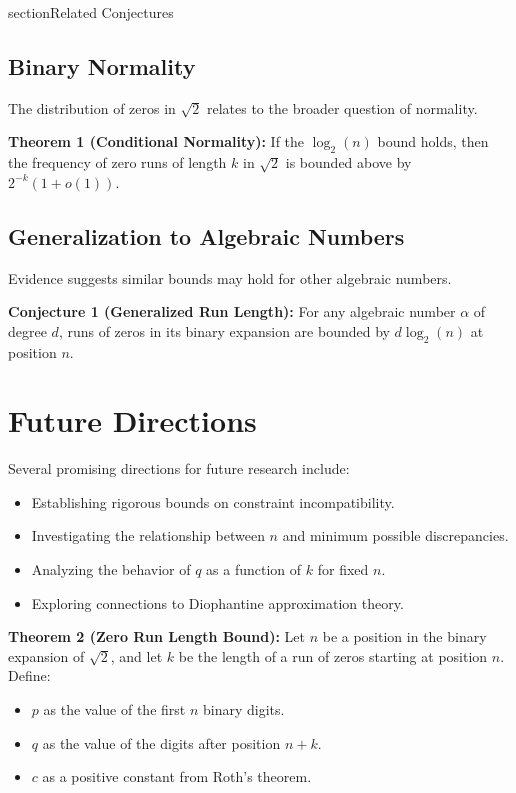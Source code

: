 section{Related Conjectures}

\subsection{Binary Normality}
The distribution of zeros in $\sqrt{2}$ relates to the broader question of normality.

\textbf{Theorem 1 (Conditional Normality):} If the $\log_2(n)$ bound holds, then the frequency of zero
runs of length $k$ in $\sqrt{2}$ is bounded above by $2^{-k}(1 + o(1))$.

\subsection{Generalization to Algebraic Numbers}
Evidence suggests similar bounds may hold for other algebraic numbers.

\textbf{Conjecture 1 (Generalized Run Length):} For any algebraic number $\alpha$ of degree $d$, runs of
zeros in its binary expansion are bounded by $d \log_2(n)$ at position $n$.

\section{Future Directions}
Several promising directions for future research include:
\begin{itemize}
    \item Establishing rigorous bounds on constraint incompatibility.
    \item Investigating the relationship between $n$ and minimum possible discrepancies.
    \item Analyzing the behavior of $q$ as a function of $k$ for fixed $n$.
    \item Exploring connections to Diophantine approximation theory.
\end{itemize}

\textbf{Theorem 2 (Zero Run Length Bound):} Let $n$ be a position in the binary expansion of $\sqrt{2}$,
and let $k$ be the length of a run of zeros starting at position $n$. Define:
\begin{itemize}
    \item $p$ as the value of the first $n$ binary digits.
    \item $q$ as the value of the digits after position $n+k$.
    \item $c$ as a positive constant from Roth’s theorem.
\end{itemize}

